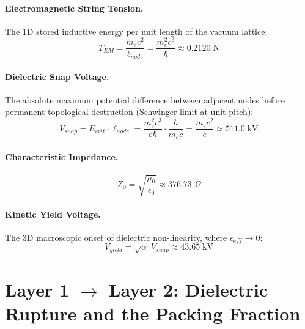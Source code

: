 \paragraph{Electromagnetic String Tension.}
The 1D stored inductive energy per unit length of the vacuum lattice:
\begin{equation}
    T_{EM} = \frac{m_e c^2}{\ell_{node}}
    = \frac{m_e^2 c^3}{\hbar}
    \approx 0.2120\;\text{N}
    \label{eq:T_EM}
\end{equation}

\paragraph{Dielectric Snap Voltage.}
The absolute maximum potential difference between adjacent nodes before
permanent topological destruction (Schwinger limit at unit pitch):
\begin{equation}
    V_{snap} = E_{crit} \cdot \ell_{node}
    = \frac{m_e^2 c^3}{e\hbar} \cdot \frac{\hbar}{m_e c}
    = \frac{m_e c^2}{e}
    \approx 511.0\;\text{kV}
    \label{eq:Vsnap}
\end{equation}

\paragraph{Characteristic Impedance.}
\begin{equation}
    Z_0 = \sqrt{\frac{\mu_0}{\epsilon_0}}
    \approx 376.73\;\Omega
    \label{eq:Z0}
\end{equation}

\paragraph{Kinetic Yield Voltage.}
The 3D macroscopic onset of dielectric non-linearity, where
$\epsilon_{eff} \to 0$:
\begin{equation}
    V_{yield} = \sqrt{\alpha}\;V_{snap}
    \approx 43.65\;\text{kV}
    \label{eq:Vyield}
\end{equation}

\section{Layer 1 $\to$ Layer 2: Dielectric Rupture and the Packing Fraction}
\label{sec:layer12}

